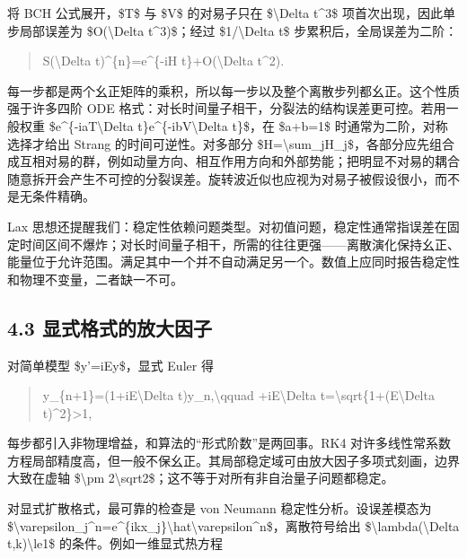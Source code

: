 \documentclass[UTF8,openany,11pt,fontset=fandol]{ctexbook}
\begin{document}
将 BCH 公式展开，\$T\$ 与 \$V\$ 的对易子只在 \$\textbackslash Delta
t\^{}3\$ 项首次出现，因此单步局部误差为 \$O(\textbackslash Delta
t\^{}3)\$；经过 \$1/\textbackslash Delta t\$ 步累积后，全局误差为二阶：

\begin{quote}
S(\textbackslash Delta t)\^{}\{n\}=e\^{}\{-iH t\}+O(\textbackslash Delta
t\^{}2).
\end{quote}

每一步都是两个幺正矩阵的乘积，所以每一步以及整个离散步列都幺正。这个性质强于许多四阶
ODE 格式：对长时间量子相干，分裂法的结构误差更可控。若用一般权重
\$e\^{}\{-iaT\textbackslash Delta t\}e\^{}\{-ibV\textbackslash Delta
t\}\$，在 \$a+b=1\$ 时通常为二阶，对称选择才给出 Strang
的时间可逆性。对多部分
\$H=\textbackslash sum\_jH\_j\$，各部分应先组合成互相对易的群，例如动量方向、相互作用方向和外部势能；把明显不对易的耦合随意拆开会产生不可控的分裂误差。旋转波近似也应视为对易子被假设很小，而不是无条件精确。

Lax
思想还提醒我们：稳定性依赖问题类型。对初值问题，稳定性通常指误差在固定时间区间不爆炸；对长时间量子相干，所需的往往更强------离散演化保持幺正、能量位于允许范围。满足其中一个并不自动满足另一个。数值上应同时报告稳定性和物理不变量，二者缺一不可。

\subsection{\texorpdfstring{\textbf{4.3
显式格式的放大因子}}{4.3 显式格式的放大因子}}\label{ux663eux5f0fux683cux5f0fux7684ux653eux5927ux56e0ux5b50}

对简单模型 \$y'=iEy\$，显式 Euler 得

\begin{quote}
y\_\{n+1\}=(1+iE\textbackslash Delta t)y\_n,\textbackslash qquad
+iE\textbackslash Delta
t\textbar=\textbackslash sqrt\{1+(E\textbackslash Delta
t)\^{}2\}\textgreater1,
\end{quote}

每步都引入非物理增益，和算法的``形式阶数''是两回事。RK4
对许多线性常系数方程局部精度高，但一般不保幺正。其局部稳定域可由放大因子多项式刻画，边界大致在虚轴
\$\textbackslash pm
2\textbackslash sqrt2\$；这不等于对所有非自治量子问题都稳定。

对显式扩散格式，最可靠的检查是 von Neumann 稳定性分析。设误差模态为
\$\textbackslash varepsilon\_j\^{}n=e\^{}\{ikx\_j\}\textbackslash hat\textbackslash varepsilon\^{}n\$，离散符号给出
\$\textbar\textbackslash lambda(\textbackslash Delta
t,k)\textbar\textbackslash le1\$ 的条件。例如一维显式热方程
\end{document}

